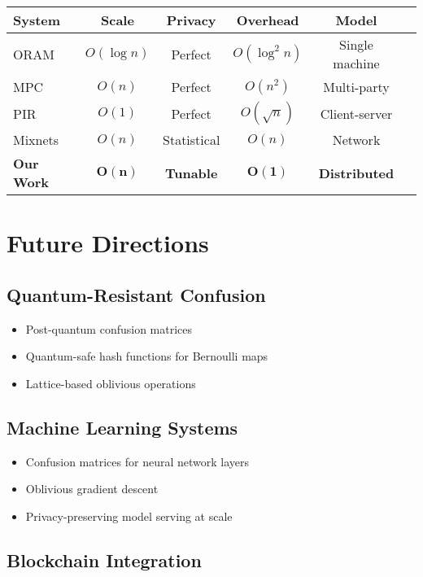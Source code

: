 \documentclass[11pt,final]{article}
\begin{document}
\begin{center}
\begin{tabular}{lccccc}
\toprule
\textbf{System} & \textbf{Scale} & \textbf{Privacy} & \textbf{Overhead} & \textbf{Model} \\
\midrule
ORAM & $O(\log n)$ & Perfect & $O(\log^2 n)$ & Single machine \\
MPC & $O(n)$ & Perfect & $O(n^2)$ & Multi-party \\
PIR & $O(1)$ & Perfect & $O(\sqrt{n})$ & Client-server \\
Mixnets & $O(n)$ & Statistical & $O(n)$ & Network \\
\textbf{Our Work} & $\mathbf{O(n)}$ & \textbf{Tunable} & $\mathbf{O(1)}$ & \textbf{Distributed} \\
\bottomrule
\end{tabular}
\end{center}

\section{Future Directions}

\subsection{Quantum-Resistant Confusion}

\begin{itemize}
    \item Post-quantum confusion matrices
    \item Quantum-safe hash functions for Bernoulli maps
    \item Lattice-based oblivious operations
\end{itemize}

\subsection{Machine Learning Systems}

\begin{itemize}
    \item Confusion matrices for neural network layers
    \item Oblivious gradient descent
    \item Privacy-preserving model serving at scale
\end{itemize}

\subsection{Blockchain Integration}
\end{document}
